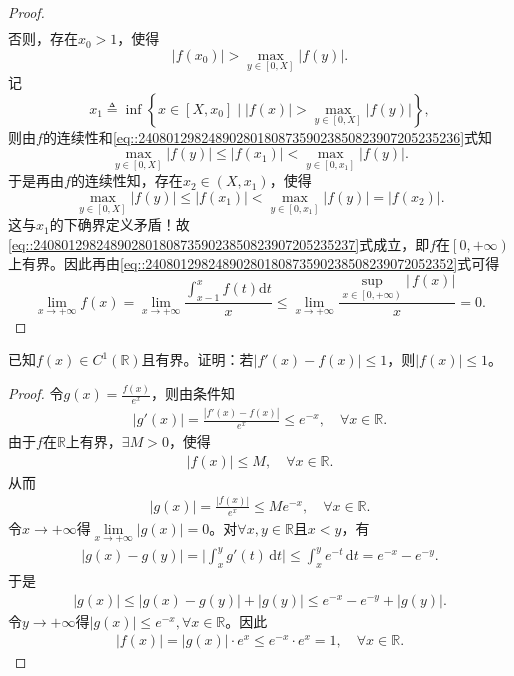 \documentclass[../../main.tex]{subfiles}%
\begin{document}
\begin{proof}
\begin{align}
\end{align}
否则，存在$x_0>1$，使得
\[
\left| f\left( x_0 \right) \right|>\max_{y\in \left[ 0,X \right]} \left| f\left( y \right) \right|.
\]
记
\[
x_1\triangleq \inf\left\{ x\in \left[ X,x_0 \right] \mid \left| f\left( x \right) \right|>\max_{y\in \left[ 0,X \right]} \left| f\left( y \right) \right| \right\},
\]
则由$f$的连续性和\eqref{eq::2408012982489028018087359023850823907205235236}式知
\[
\max_{y\in \left[ 0,X \right]} \left| f\left( y \right) \right|\leqslant \left| f\left( x_1 \right) \right|<\max_{y\in \left[ 0,x_1 \right]} \left| f\left( y \right) \right|.
\]
于是再由$f$的连续性知，存在$x_2\in \left( X,x_1 \right)$，使得
\[
\max_{y\in \left[ 0,X \right]} \left| f\left( y \right) \right|\leqslant \left| f\left( x_1 \right) \right|<\max_{y\in \left[ 0,x_1 \right]} \left| f\left( y \right) \right|=\left| f\left( x_2 \right) \right|.
\]
这与$x_1$的下确界定义矛盾！故\eqref{eq::2408012982489028018087359023850823907205235237}式成立，即$f$在$\left[ 0,+\infty \right)$上有界。因此再由\eqref{eq::24080129824890280180873590238508239072052352}式可得
\[
\lim_{x\rightarrow +\infty} f\left( x \right) =\lim_{x\rightarrow +\infty} \frac{\int_{x-1}^x{f\left( t \right) \mathrm{d}t}}{x}\leqslant \lim_{x\rightarrow +\infty} \frac{\sup\limits_{x\in \left[ 0,+\infty \right)} \left| \,f\left( x \right) \right|}{x}=0.
\]
\end{proof}

\begin{example}
已知$f(x)\in C^1(\mathbb{R})$且有界。证明：若$|f'(x)-f(x)|\leqslant 1$，则$|f(x)|\leqslant 1$。
\end{example}
\begin{proof}
令$g(x)=\frac{f(x)}{e^x}$，则由条件知
\begin{align*}
|g'(x)|=\frac{|f'(x)-f(x)|}{e^x}\leqslant e^{-x},\quad \forall x\in\mathbb{R}.
\end{align*}
由于$f$在$\mathbb{R}$上有界，$\exists M>0$，使得
\begin{align*}
|f(x)|\leqslant M,\quad \forall x\in\mathbb{R}.
\end{align*}
从而
\begin{align*}
|g(x)|=\frac{|f(x)|}{e^x}\leqslant M e^{-x},\quad \forall x\in\mathbb{R}.
\end{align*}
令$x\to+\infty$得$\lim\limits_{x\to+\infty}|g(x)|=0$。对$\forall x,y\in\mathbb{R}$且$x<y$，有
\begin{align*}
|g(x)-g(y)|=\biggl|\int_{x}^{y}g'(t)\,\mathrm{d}t\biggr|\leqslant \int_{x}^{y}e^{-t}\,\mathrm{d}t=e^{-x}-e^{-y}.
\end{align*}
于是
\begin{align*}
|g(x)|\leqslant |g(x)-g(y)|+|g(y)|\leqslant e^{-x}-e^{-y}+|g(y)|.
\end{align*}
令$y\to+\infty$得$|g(x)|\leqslant e^{-x},\forall x\in\mathbb{R}$。因此
\begin{align*}
|f(x)|=|g(x)|\cdot e^x\leqslant e^{-x}\cdot e^x=1,\quad \forall x\in\mathbb{R}.
\end{align*}
\end{proof}
\end{document}
